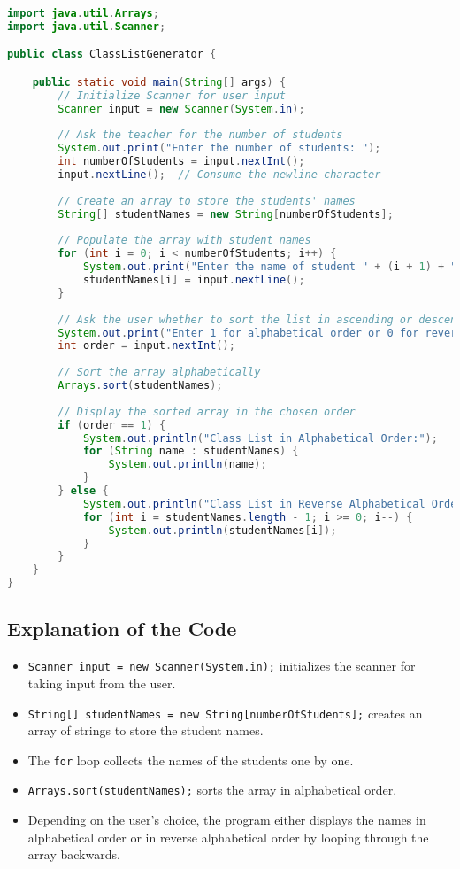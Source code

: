 \documentclass{article}
\begin{document}
\begin{lstlisting}[language=Java]
import java.util.Arrays;
import java.util.Scanner;

public class ClassListGenerator {

    public static void main(String[] args) {
        // Initialize Scanner for user input
        Scanner input = new Scanner(System.in);
        
        // Ask the teacher for the number of students
        System.out.print("Enter the number of students: ");
        int numberOfStudents = input.nextInt();
        input.nextLine();  // Consume the newline character
        
        // Create an array to store the students' names
        String[] studentNames = new String[numberOfStudents];
        
        // Populate the array with student names
        for (int i = 0; i < numberOfStudents; i++) {
            System.out.print("Enter the name of student " + (i + 1) + ": ");
            studentNames[i] = input.nextLine();
        }
        
        // Ask the user whether to sort the list in ascending or descending order
        System.out.print("Enter 1 for alphabetical order or 0 for reverse alphabetical order: ");
        int order = input.nextInt();
        
        // Sort the array alphabetically
        Arrays.sort(studentNames);
        
        // Display the sorted array in the chosen order
        if (order == 1) {
            System.out.println("Class List in Alphabetical Order:");
            for (String name : studentNames) {
                System.out.println(name);
            }
        } else {
            System.out.println("Class List in Reverse Alphabetical Order:");
            for (int i = studentNames.length - 1; i >= 0; i--) {
                System.out.println(studentNames[i]);
            }
        }
    }
}
\end{lstlisting}

\subsection{Explanation of the Code}
\begin{itemize}
    \item \texttt{Scanner input = new Scanner(System.in);} initializes the scanner for taking input from the user.
    \item \texttt{String[] studentNames = new String[numberOfStudents];} creates an array of strings to store the student names.
    \item The \texttt{for} loop collects the names of the students one by one.
    \item \texttt{Arrays.sort(studentNames);} sorts the array in alphabetical order.
    \item Depending on the user’s choice, the program either displays the names in alphabetical order or in reverse alphabetical order by looping through the array backwards.
\end{itemize}
\end{document}
